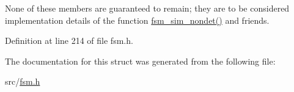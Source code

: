 \-None of these members are guaranteed to remain; they are to be considered implementation details of the function \hyperlink{simulation_8c_ab39350b6a48388414f90cb3d248be612}{fsm\-\_\-sim\-\_\-nondet()} and friends. 

\-Definition at line 214 of file fsm.\-h.



\-The documentation for this struct was generated from the following file\-:\begin{DoxyCompactItemize}
\item 
src/\hyperlink{fsm_8h}{fsm.\-h}\end{DoxyCompactItemize}
